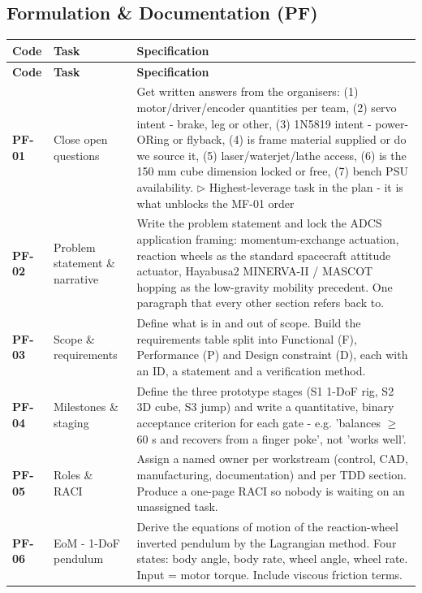 \subsection{Formulation \& Documentation (PF)}
{\small
\setlength{\tabcolsep}{4pt}%
\begin{longtable}{@{}L{1.1cm} L{3.0cm} L{11.0cm}@{}}
\toprule
\textbf{Code} & \textbf{Task} & \textbf{Specification} \\
\midrule\endfirsthead
\toprule
\textbf{Code} & \textbf{Task} & \textbf{Specification} \\
\midrule\endhead
\bottomrule\endfoot
\textbf{PF-01} & Close open questions & Get written answers from the organisers: (1) motor/driver/encoder quantities per team, (2) servo intent - brake, leg or other, (3) 1N5819 intent - power-ORing or flyback, (4) is frame material supplied or do we source it, (5) laser/waterjet/lathe access, (6) is the 150 mm cube dimension locked or free, (7) bench PSU availability. \newline\textcolor{p0col}{\footnotesize$\triangleright$ Highest-leverage task in the plan - it is what unblocks the MF-01 order} \\[2pt]
\textbf{PF-02} & Problem statement \& narrative & Write the problem statement and lock the ADCS application framing: momentum-exchange actuation, reaction wheels as the standard spacecraft attitude actuator, Hayabusa2 MINERVA-II / MASCOT hopping as the low-gravity mobility precedent. One paragraph that every other section refers back to. \\[2pt]
\textbf{PF-03} & Scope \& requirements & Define what is in and out of scope. Build the requirements table split into Functional (F), Performance (P) and Design constraint (D), each with an ID, a statement and a verification method. \\[2pt]
\textbf{PF-04} & Milestones \& staging & Define the three prototype stages (S1 1-DoF rig, S2 3D cube, S3 jump) and write a quantitative, binary acceptance criterion for each gate - e.g. 'balances $\geq$60 s and recovers from a finger poke', not 'works well'. \\[2pt]
\textbf{PF-05} & Roles \& RACI & Assign a named owner per workstream (control, CAD, manufacturing, documentation) and per TDD section. Produce a one-page RACI so nobody is waiting on an unassigned task. \\[2pt]
\textbf{PF-06} & EoM - 1-DoF pendulum & Derive the equations of motion of the reaction-wheel inverted pendulum by the Lagrangian method. Four states: body angle, body rate, wheel angle, wheel rate. Input = motor torque. Include viscous friction terms. \\[2pt]

\end{longtable}}
